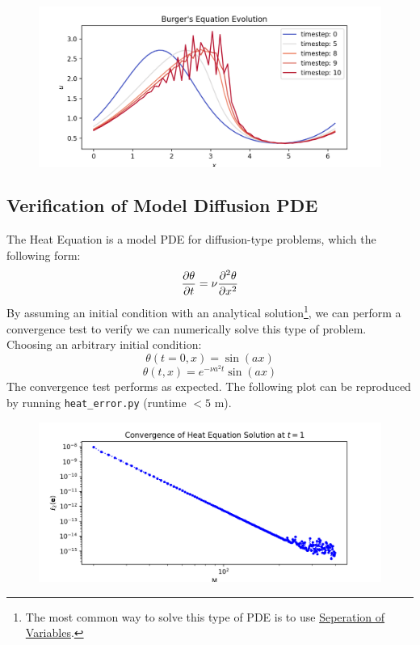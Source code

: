 \documentclass[12pt, reqno]{amsart}
\begin{document}
\begin{figure}[H]
    \centering
    \includegraphics[width = 1\linewidth]{Burger's Equation Evolution.png}
\end{figure}

\subsection{Verification of Model Diffusion PDE}
The Heat Equation is a model PDE for diffusion-type problems, which the following form:
\begin{equation}
    \pdv{\theta}{t} = \nu \pdv[2]{\theta}{x}
\end{equation}
By assuming an initial condition with an analytical solution\footnote{The most common way to solve this type of PDE is to use \href{https://en.wikipedia.org/wiki/Separation_of_variables}{Seperation of Variables}.}, we can perform a convergence test to verify we can numerically solve this type of problem. Choosing an arbitrary initial condition:
\begin{equation}
    \theta(t = 0, x) = \sin(ax)
\end{equation}
\begin{equation}
    \theta(t, x) = e^{-\nu a^2 t} \sin(ax)
\end{equation}
The convergence test performs as expected. The following plot can be reproduced by running \texttt{heat\_error.py} (runtime $<5$ m).

\begin{figure}[H]
    \centering
    \includegraphics[width = 1\linewidth]{Heat Error.png}
\end{figure}
\end{document}
